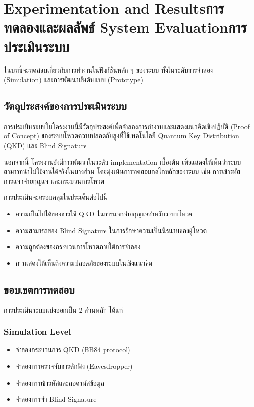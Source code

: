 \chapter{\ifproject%
\ifenglish Experimentation and Results\else การทดลองและผลลัพธ์\fi
\else%
\ifenglish System Evaluation\else การประเมินระบบ\fi
\fi}

ในบทนี้จะทดสอบเกี่ยวกับการทำงานในฟังก์ชันหลัก ๆ ของระบบ ทั้งในระดับการจำลอง (Simulation) และการพัฒนาเชิงต้นแบบ (Prototype)

\section{วัตถุประสงค์ของการประเมินระบบ}

การประเมินระบบในโครงงานนี้มีวัตถุประสงค์เพื่อจำลองการทำงานและแสดงแนวคิดเชิงปฏิบัติ (Proof of Concept) ของระบบโหวตความปลอดภัยสูงที่ใช้เทคโนโลยี Quantum Key Distribution (QKD) และ Blind Signature

นอกจากนี้ โครงงานยังมีการพัฒนาในระดับ implementation เบื้องต้น เพื่อแสดงให้เห็นว่าระบบสามารถนำไปใช้งานได้จริงในบางส่วน โดยมุ่งเน้นการทดสอบกลไกหลักของระบบ เช่น การเข้ารหัส การแจกจ่ายกุญแจ และกระบวนการโหวต

การประเมินจะครอบคลุมในประเด็นต่อไปนี้

\begin{itemize}
    \item ความเป็นไปได้ของการใช้ QKD ในการแจกจ่ายกุญแจสำหรับระบบโหวต
    \item ความสามารถของ Blind Signature ในการรักษาความเป็นนิรนามของผู้โหวต
    \item ความถูกต้องของกระบวนการโหวตภายใต้การจำลอง
    \item การแสดงให้เห็นถึงความปลอดภัยของระบบในเชิงแนวคิด
\end{itemize}

\section{ขอบเขตการทดสอบ}

การประเมินระบบแบ่งออกเป็น 2 ส่วนหลัก ได้แก่

\subsection{Simulation Level}

\begin{itemize}
    \item จำลองกระบวนการ QKD (BB84 protocol)
    \item จำลองการตรวจจับการดักฟัง (Eavesdropper)
    \item จำลองการเข้ารหัสและถอดรหัสข้อมูล
    \item จำลองการทำ Blind Signature
\end{itemize}

